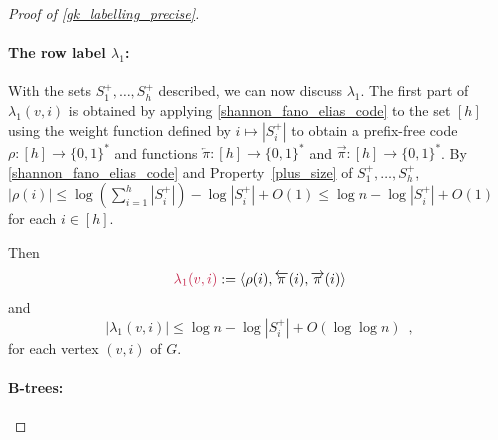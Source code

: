 \documentclass{patmorin}
\makeatletter
\renewcommand{\le}{\leqslant}
\def\mathcolor#1#{\@mathcolor{#1}}
\def\@mathcolor#1#2#3{%
  \protect\leavevmode
  \begingroup
    \color#1{#2}#3%
  \endgroup
}
\newcommand{\mathdefin}[1]{\mathcolor{brightmaroon}{#1}}
\newcommand{\Oh}{O}
\newcommand{\calR}{\mathcal{R}}
\makeatother
\begin{document}
\begin{proof}[Proof of \cref{gk_labelling_precise}]
  \paragraph{\boldmath The row label $\lambda_1$:}
  With the sets $S^+_1,\ldots,S^+_h$ described, we can now discuss $\lambda_1$.
  The first part of $\lambda_1(v,i)$ is obtained by applying \cref{shannon_fano_elias_code} to the set $[h]$ using the weight function defined by $i \mapsto |S^+_i|$ to obtain a prefix-free code $\rho:[h]\to\{0,1\}^*$ and functions $\overleftarrow{\pi}:[h]\to\{0,1\}^*$ and $\overrightarrow{\pi}:[h]\to\{0,1\}^*$. By \cref{shannon_fano_elias_code} and Property~\ref{plus_size} of $S^+_1,\ldots,S^+_h$, $|\rho(i)|\le \log(\sum_{i=1}^h |S^+_i|) - \log|S^+_i| + \Oh(1)\le \log n - \log|S^+_i| + \Oh(1)$ for each $i\in[h]$.


  Then
  \[
    \mathdefin{\lambda_1(v,i)}:=\langle \rho(i),\overleftarrow{\pi}(i),\overrightarrow{\pi}(i)\rangle
  \]
  and
  \begin{equation}
    |\lambda_1(v,i)|\le \log n - \log |S^+_i| + \Oh(\log\log n) \enspace ,
    \label{lambda_one_length}
  \end{equation}
  for each vertex $(v,i)$ of $G$.

  \paragraph{B-trees:}


\end{proof}
\end{document}
